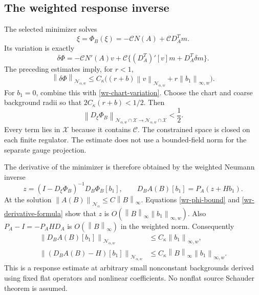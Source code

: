 \documentclass[11pt]{article}
\theoremstyle{remark}\newtheorem{remark}[theorem]{Remark}
\newcommand{\norm}[1]{\left\lVert#1\right\rVert}
\begin{document}
\subsection{The weighted response inverse}
\label{wr-response-inverse}

The selected minimizer solves
\begin{equation}\label{wr-fixed-point}
 \xi=\Phi_B(\xi)=-\mathcal C N(A)+\mathcal C D_A^Tm.
\end{equation}
Its variation is exactly
\begin{equation}\label{wr-phi-variation}
 \delta\Phi=-\mathcal C N'(A)v
       +\mathcal C\{(D_A^T)'[v]m+D_A^T\delta m\}.
\end{equation}
The preceding estimates imply, for $r<1$,
\begin{equation}\label{wr-phi-bound}
 \norm{\delta\Phi}_{\mathcal N_{\alpha,w}}
 \le C_\kappa\bigl((r+b)\norm{v}_{\mathcal N_{\alpha,w}}
                            +r\norm{b_1}_{\infty,w}\bigr).
\end{equation}
For $b_1=0$, combine this with
\eqref{wr-chart-variation}. Choose the chart and coarse
background radii so that $2C_\kappa(r+b)<1/2$. Then
\begin{equation}\label{wr-weighted-contraction}
 \norm{D_\xi\Phi_B}_{\mathcal N_{\alpha,w}\cap\mathcal X
                         \to\mathcal N_{\alpha,w}\cap\mathcal X}
 <\frac12.
\end{equation}
Every term lies in $\mathcal X$ because it contains $\mathcal C$.
The constrained space is closed on each finite regulator. The
estimate does not use a bounded-field norm for the separate gauge
projection.

The derivative of the minimizer is therefore obtained by the
weighted Neumann inverse
\begin{equation}\label{wr-derivative-formula}
 z=(I-D_\xi\Phi_B)^{-1}D_B\Phi_B[b_1],\qquad
 D_BA(B)[b_1]=P_A(z+Hb_1).
\end{equation}
At the solution $\norm{A(B)}_{\mathcal N_\alpha}
\le C\norm{B}_\infty$. Equations \eqref{wr-phi-bound} and
\eqref{wr-derivative-formula} show that $z$ is
$O(\norm{B}_\infty\norm{b_1}_{\infty,w})$.
Also $P_A-I=-P_AHD_A$ is $O(\norm{B}_\infty)$ in the
weighted norm. Consequently
\begin{equation}\label{wr-main-response}
 \boxed{\begin{aligned}
 \norm{D_BA(B)[b_1]}_{\mathcal N_{\alpha,w}}
 &\le C_\kappa\norm{b_1}_{\infty,w},\\
 \norm{(D_BA(B)-H)[b_1]}_{\mathcal N_{\alpha,w}}
 &\le C_\kappa\norm{B}_\infty\norm{b_1}_{\infty,w}.
 \end{aligned}}
\end{equation}
This is a response estimate at arbitrary small nonconstant
backgrounds derived using fixed flat operators and nonlinear
coefficients. No nonflat source Schauder theorem is assumed.
\end{document}
